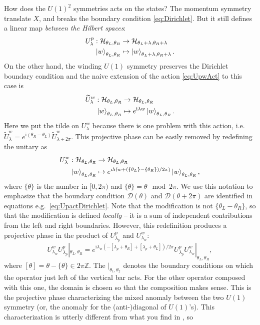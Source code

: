 \documentclass[
]{scrartcl}
\numberwithin{equation}{section}
\renewenvironment{align}{\begin{equation}\begin{aligned}}{\end{aligned}\end{equation}}
\theoremstyle{definition}
\theoremstyle{definition}
\theoremstyle{definition}
\theoremstyle{definition}
\theoremstyle{remark}
\begin{document}
How does the \(U(1)^2\) symmetries acts on the states?
The momentum symmetry translate \(X\), and breaks the boundary condition \eqref{eq:Dirichlet}.
But it still defines a linear map \emph{between the Hilbert spaces}:
\begin{align}
    \label{eq:UpactDirichlet}
    U^p_\lambda : \mathcal{H}_{\theta_L,\theta_R} &\to \mathcal{H}_{\theta_L+\lambda,\theta_R+\lambda}\\
    \ket{w}_{\theta_L,\theta_R} &\mapsto \ket{w}_{\theta_L+\lambda,\theta_R+\lambda}.
\end{align}
On the other hand, the winding \(U(1)\) symmetry preserves the Dirichlet boundary condition and the naive extension of the action \eqref{eq:UpwAct} to this case is
\begin{align}
    \label{eq:tildeUwactDirichlet}
    \widetilde{U}^w_\lambda : \mathcal{H}_{\theta_L,\theta_R} &\to \mathcal{H}_{\theta_L,\theta_R}\\
    \ket{w}_{\theta_L,\theta_R} &\mapsto e^{\mathrm{i}\lambda w}\ket{w}_{\theta_L,\theta_R}.
\end{align}
Here we put the tilde on \(U^w_\lambda\) because there is one problem with this action, i.e.~\(\widetilde{U}^w_\lambda = e^{\mathrm{i}(\theta_R-\theta_L)}\widetilde{U}^w_{\lambda+2\pi}\).
This projective phase can be easily removed by redefining the unitary as
\begin{align}
    \label{eq:UwactDirichlet}
    U^w_\lambda : \mathcal{H}_{\theta_L,\theta_R} &\to \mathcal{H}_{\theta_L,\theta_R}\\
    \ket{w}_{\theta_L,\theta_R} &\mapsto e^{\mathrm{i}\lambda (w+(\{\theta_L\}-\{\theta_R\})/2\pi)}\ket{w}_{\theta_L,\theta_R},
\end{align}
where \(\{\theta\}\) is the number in \([0,2\pi)\) and \(\{\theta\} = \theta \mod 2\pi\).
We use this notation to emphasize that the boundary condition \(\mathcal{D}(\theta)\) and \(\mathcal{D}(\theta+2\pi)\) are identified in equations e.g.~\eqref{eq:UpactDirichlet}.
Note that the modification is not \(\{\theta_L-\theta_R\}\), so that the modification is defined \emph{locally} -- it is a sum of independent contributions from the left and right boundaries.
However, this redefinition produces a projective phase in the product of \(U^p_{\lambda_p}\) and \(U^w_{\lambda_w}\):
\begin{equation}
    \label{eq:UpUwcomu}
    U^w_{\lambda_w}U^p_{\lambda_p}|_{\theta_L,\theta_R} = e^{\mathrm{i}\lambda_w(-[\lambda_p+\theta_R] + [\lambda_p+\theta_L])/2\pi} U^p_{\lambda_p}U^w_{\lambda_w}|_{\theta_L,\theta_R},
\end{equation}
where \([\theta] = \theta - \{\theta\} \in 2\pi \mathbb{Z}\).
The \(|_{\theta_1,\theta_2}\) denotes the boundary conditions on which the operator just left of the vertical bar acts. For the other operator composed with this one, the domain is chosen so that the composition makes sense.
This is the projective phase characterizing the mixed anomaly between the two \(U(1)\) symmetry (or, the anomaly for the (anti-)diagonal of \(U(1)\)'s).
This characterization is utterly different from what you find in \textcite{PolchinskiVol1}, so
\end{document}
